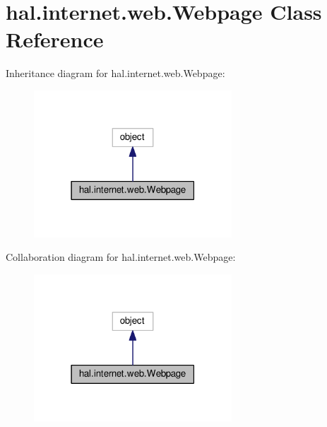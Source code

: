 \hypertarget{classhal_1_1internet_1_1web_1_1_webpage}{}\section{hal.\+internet.\+web.\+Webpage Class Reference}
\label{classhal_1_1internet_1_1web_1_1_webpage}


Inheritance diagram for hal.\+internet.\+web.\+Webpage\+:\nopagebreak
\begin{figure}[H]
\begin{center}
\leavevmode
\includegraphics[width=210pt]{classhal_1_1internet_1_1web_1_1_webpage__inherit__graph}
\end{center}
\end{figure}


Collaboration diagram for hal.\+internet.\+web.\+Webpage\+:\nopagebreak
\begin{figure}[H]
\begin{center}
\leavevmode
\includegraphics[width=210pt]{classhal_1_1internet_1_1web_1_1_webpage__coll__graph}
\end{center}
\end{figure}

